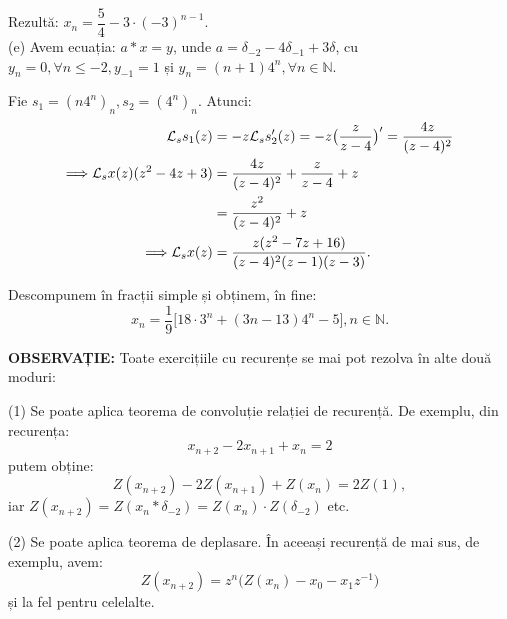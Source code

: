 Rezultă: $x_n = \dfrac{5}{4} - 3 \cdot (-3)^{n-1}$. \\

(e) Avem ecuația: $a \ast x = y$, unde 
$a = \delta_{-2} - 4 \delta_{-1} + 3 \delta$, cu 
$y_n = 0, \forall n \leq -2, y_{-1} = 1$ și 
$y_n = (n+1)4^n, \forall n \in \mathbb{N}$.

Fie $s_1 = (n4^n)_n, s_2 = (4^n)_n$. Atunci:
\begin{align*}
  \mathcal{L}_s s_1(z) &= -z \mathcal{L}_s s_2^{\prime}(z) 
                  = - z \big( \dfrac{z}{z-4} \big)^{\prime} = \dfrac{4z}{(z-4)^2} \\
  \Longrightarrow \mathcal{L}_s x(z)(z^2 - 4z + 3) 
                &= \dfrac{4z}{(z-4)^2} + \dfrac{z}{z-4} + z \\
                &= \dfrac{z^2}{(z-4)^2} + z \\
  \Longrightarrow  \mathcal{L}_s x(z) &= \dfrac{z(z^2 - 7z + 16)}{(z-4)^2 (z-1) (z-3)}.
\end{align*}

Descompunem în fracții simple și obținem, în fine: 
\[
  x_n = \dfrac{1}{9} \big[ 18 \cdot 3^n + (3n - 13) 4^n - 5 \big], 
  n \in \mathbb{N}.
\]

\textbf{OBSERVAȚIE:} Toate exercițiile cu recurențe se mai pot rezolva în alte
două moduri:

(1) Se poate aplica teorema de convoluție relației de recurență. De exemplu,
din recurența:
\[
  x_{n + 2} - 2x_{n + 1} + x_n = 2
\]
putem obține:
\[
  Z(x_{n+2}) - 2Z(x_{n + 1}) + Z(x_n) = 2Z(1),
\]
iar $ Z(x_{n+2}) = Z(x_n \ast \delta_{-2}) = Z(x_n) \cdot Z(\delta_{-2}) $ etc.

(2) Se poate aplica teorema de deplasare. În aceeași recurență de mai sus,
de exemplu, avem:
\[
  Z(x_{n+2}) = z^n \Big( Z(x_n) - x_0 - x_1 z^{-1} \Big)
\]
și la fel pentru celelalte.



